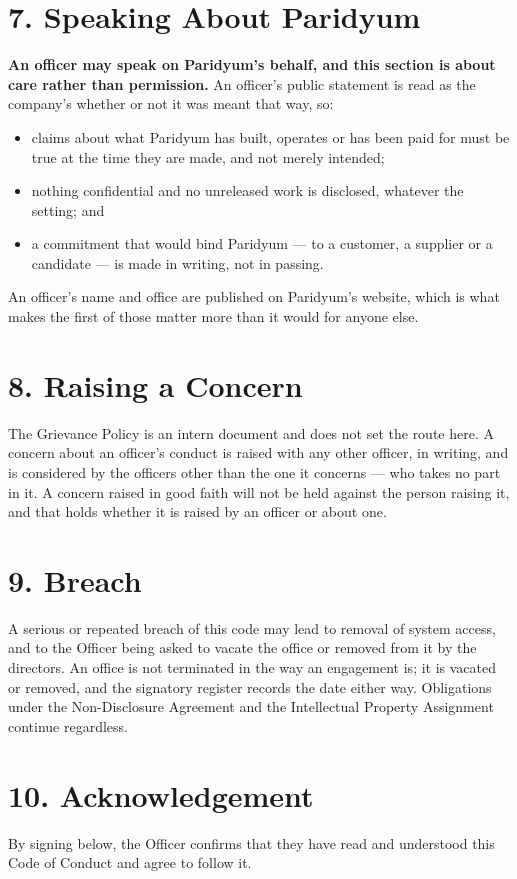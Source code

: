 \documentclass{paridyum}
\begin{document}
\section*{7. Speaking About Paridyum}
\textbf{An officer may speak on Paridyum's behalf, and this section is about care rather
than permission.} An officer's public statement is read as the company's whether or not
it was meant that way, so:
\begin{itemize}[leftmargin=*, noitemsep]
    \item claims about what Paridyum has built, operates or has been paid for must be
          true at the time they are made, and not merely intended;
    \item nothing confidential and no unreleased work is disclosed, whatever the
          setting; and
    \item a commitment that would bind Paridyum --- to a customer, a supplier or a
          candidate --- is made in writing, not in passing.
\end{itemize}
An officer's name and office are published on Paridyum's website, which is what makes
the first of those matter more than it would for anyone else.

\section*{8. Raising a Concern}
The Grievance Policy is an intern document and does not set the route here. A concern
about an officer's conduct is raised with any other officer, in writing, and is
considered by the officers other than the one it concerns --- who takes no part in it.
A concern raised in good faith will not be held against the person raising it, and that
holds whether it is raised by an officer or about one.

\section*{9. Breach}
A serious or repeated breach of this code may lead to removal of system access, and to
the Officer being asked to vacate the office or removed from it by the directors. An
office is not terminated in the way an engagement is; it is vacated or removed, and the
signatory register records the date either way. Obligations under the Non-Disclosure
Agreement and the Intellectual Property Assignment continue regardless.

\section*{10. Acknowledgement}
By signing below, the Officer confirms that they have read and understood this
Code of Conduct and agree to follow it.

\vspace{1.5em}
\paridyumsignblock

\vspace{1.5em}
\end{document}
